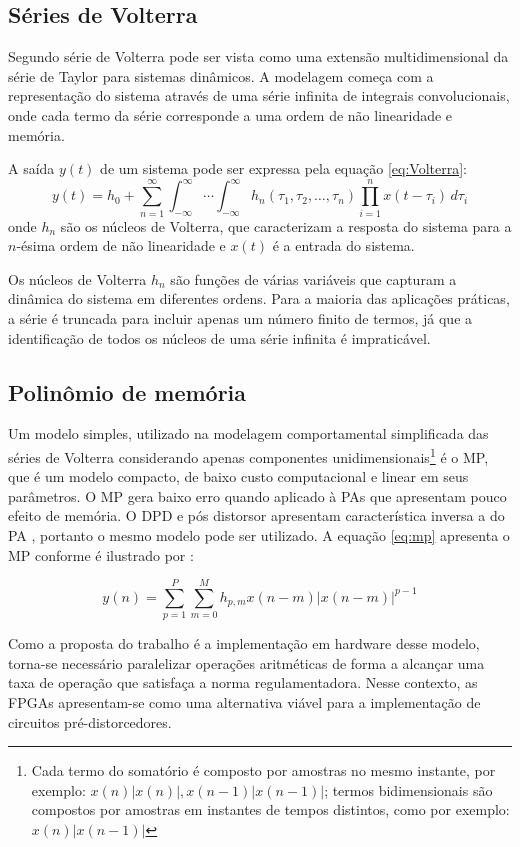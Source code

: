 \subsection{Séries de Volterra}

Segundo \cite{Gonçalves2009} série de Volterra pode ser vista como uma extensão multidimensional da série de Taylor para sistemas dinâmicos. A modelagem começa com a representação do sistema através de uma série infinita de integrais convolucionais, onde cada termo da série corresponde a uma ordem de não linearidade e memória.

A saída \( y(t) \) de um sistema pode ser expressa pela equação \ref{eq:Volterra}: \begin{equation}
	y(t) = h_0 + \sum_{n=1}^{\infty} \int_{-\infty}^{\infty} \cdots \int_{-\infty}^{\infty} h_n(\tau_1, \tau_2, \ldots, \tau_n) \prod_{i=1}^{n} x(t - \tau_i) \, d\tau_i
	\label{eq:Volterra}
\end{equation} onde \( h_n \) são os núcleos de Volterra, que caracterizam a resposta do sistema para a \( n \)-ésima ordem de não linearidade e \( x(t) \) é a entrada do sistema.

Os núcleos de Volterra \( h_n \) são funções de várias variáveis que capturam a dinâmica do sistema em diferentes ordens. Para a maioria das aplicações práticas, a série é truncada para incluir apenas um número finito de termos, já que a identificação de todos os núcleos de uma série infinita é impraticável.

\subsection{Polinômio de memória}

Um modelo simples, utilizado na modelagem comportamental simplificada das séries de Volterra considerando apenas componentes unidimensionais\footnote{Cada termo do somatório é composto por amostras no mesmo instante, por exemplo: $x(n)|x(n)|,x(n - 1)|x(n - 1)|$; termos bidimensionais são compostos por amostras em instantes de tempos distintos, como por exemplo: $x(n)|x(n - 1)|$} é o MP, que é um modelo compacto, de baixo custo computacional e linear em seus parâmetros. O MP gera baixo erro quando aplicado à PAs que apresentam pouco efeito de memória. O DPD e pós distorsor apresentam característica inversa a do PA \cite{Schuartz2017}, portanto o mesmo modelo pode ser utilizado. A equação \ref{eq:mp} apresenta o MP conforme é ilustrado por \cite{Schuartz2017}: 

\begin{equation}
	y(n) = \sum_{p=1}^{P} \sum_{m=0}^{M} h_{p,m} x(n - m) \left| x(n - m) \right|^{p-1}
	\label{eq:mp}
\end{equation}

Como a proposta do trabalho é a implementação em hardware desse modelo, torna-se necessário paralelizar operações aritméticas de forma a alcançar uma taxa de operação que satisfaça a norma regulamentadora. Nesse contexto, as FPGAs apresentam-se como uma alternativa viável para a implementação de circuitos pré-distorcedores.
